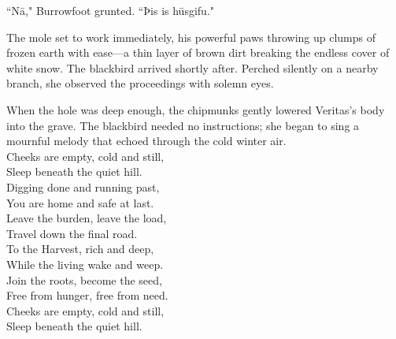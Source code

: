 ``Nā," Burrowfoot grunted. ``Þis is hūsgifu."

The mole set to work immediately, his powerful paws throwing up clumps of frozen earth with ease---a thin layer of brown dirt breaking the endless cover of white snow.
The blackbird arrived shortly after.
Perched silently on a nearby branch, she observed the proceedings with solemn eyes.

When the hole was deep enough, the chipmunks gently lowered Veritas's body into the grave.
The blackbird needed no instructions; she began to sing a mournful melody that echoed through the cold winter air.\\

Cheeks are empty, cold and still,\\
Sleep beneath the quiet hill.\\
Digging done and running past,\\
You are home and safe at last.\\

Leave the burden, leave the load,\\
Travel down the final road.\\
To the Harvest, rich and deep,\\
While the living wake and weep.\\

Join the roots, become the seed,\\
Free from hunger, free from need.\\
Cheeks are empty, cold and still,\\
Sleep beneath the quiet hill.\\























